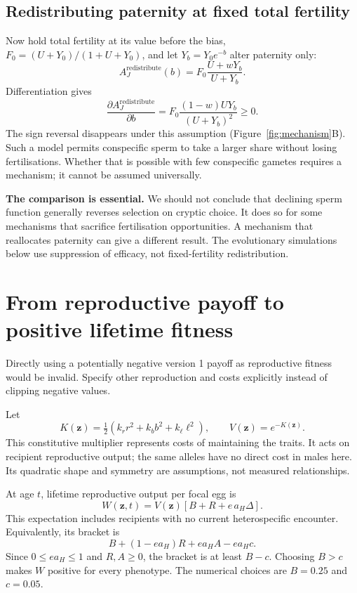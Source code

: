 \documentclass[11pt,a4paper]{article}
\begin{document}
\subsection{Redistributing paternity at fixed total fertility}
Now hold total fertility at its value before the bias, $F_0=(U+Y_0)/(1+U+Y_0)$, and let $Y_b=Y_0e^{-b}$ alter paternity only:
\begin{equation}
A_J^{\mathrm{redistribute}}(b)
=F_0\frac{U+wY_b}{U+Y_b}.
\end{equation}
Differentiation gives
\begin{equation}
\boxed{\frac{\partial A_J^{\mathrm{redistribute}}}{\partial b}
=F_0\frac{(1-w)UY_b}{(U+Y_b)^2}\geq0.}
\label{eq:redistribute}
\end{equation}
The sign reversal disappears under this assumption (Figure~\ref{fig:mechanism}B). Such a model permits conspecific sperm to take a larger share without losing fertilisations. Whether that is possible with few conspecific gametes requires a mechanism; it cannot be assumed universally.

\textbf{The comparison is essential.} We should not conclude that declining sperm function generally reverses selection on cryptic choice. It does so for some mechanisms that sacrifice fertilisation opportunities. A mechanism that reallocates paternity can give a different result. The evolutionary simulations below use suppression of efficacy, not fixed-fertility redistribution.

\section{From reproductive payoff to positive lifetime fitness}
Directly using a potentially negative version 1 payoff as reproductive fitness would be invalid. Specify other reproduction and costs explicitly instead of clipping negative values.

Let
\begin{equation}
K(\mathbf z)=\tfrac12(k_r r^2+k_b b^2+k_\ell\ell^2),\qquad
V(\mathbf z)=e^{-K(\mathbf z)}.
\label{eq:cost}
\end{equation}
This constitutive multiplier represents costs of maintaining the traits. It acts on recipient reproductive output; the same alleles have no direct cost in males here. Its quadratic shape and symmetry are assumptions, not measured relationships.

At age $t$, lifetime reproductive output per focal egg is
\begin{equation}
W(\mathbf z,t)=V(\mathbf z)\left[B+R+e\,a_H\Delta\right].
\label{eq:W}
\end{equation}
This expectation includes recipients with no current heterospecific encounter. Equivalently, its bracket is
\begin{equation}
B+(1-ea_H)R+ea_H A-ea_Hc.
\end{equation}
Since $0\leq ea_H\leq1$ and $R,A\geq0$, the bracket is at least $B-c$. Choosing $B>c$ makes $W$ positive for every phenotype. The numerical choices are $B=0.25$ and $c=0.05$.
\end{document}
